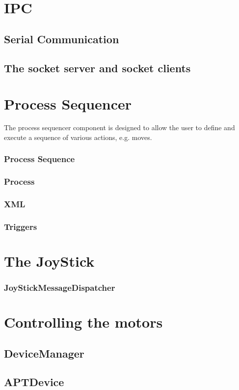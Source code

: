 \documentclass[11pt,fleqn]{book} %
\begin{document}
\chapter{IPC}
\section{Serial Communication}
\section{The socket server and socket clients}

\chapter{Process Sequencer}
The process sequencer component is designed to allow the user to define and execute a sequence of various actions, e.g. moves.

\subsection{Process Sequence}
\subsection{Process	}
\subsection{XML}
\subsection{Triggers}

\chapter{The JoyStick}
\subsection{JoyStickMessageDispatcher}

\chapter{Controlling the motors}
\section{DeviceManager}
\section{APTDevice}
\end{document}
